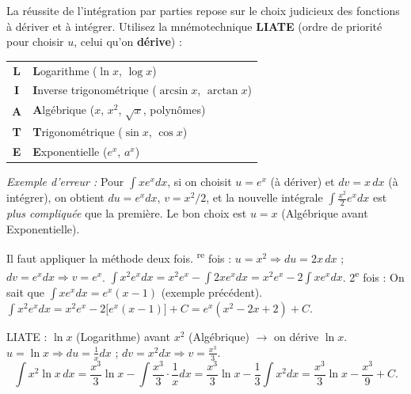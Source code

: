 \documentclass[11pt]{article}
\begin{document}
\begin{attention}
La réussite de l'intégration par parties repose sur le choix judicieux des fonctions à dériver et à intégrer. Utilisez la mnémotechnique \textbf{LIATE} (ordre de priorité pour choisir $u$, celui qu'on \textbf{dérive}) :
\begin{center}
\begin{tabular}{|c|l|}
\hline
\textbf{L} & \textbf{L}ogarithme ($\ln x$, $\log x$) \\
\textbf{I} & \textbf{I}nverse trigonométrique ($\arcsin x$, $\arctan x$) \\
\textbf{A} & \textbf{A}lgébrique ($x$, $x^2$, $\sqrt{x}$, polynômes) \\
\textbf{T} & \textbf{T}rigonométrique ($\sin x$, $\cos x$) \\
\textbf{E} & \textbf{E}xponentielle ($e^x$, $a^x$) \\
\hline
\end{tabular}
\end{center}
\emph{Exemple d'erreur :} Pour $\int x e^x dx$, si on choisit $u=e^x$ (à dériver) et $dv=x\,dx$ (à intégrer), on obtient $du=e^x dx$, $v=x^2/2$, et la nouvelle intégrale $\int \frac{x^2}{2}e^x dx$ est \emph{plus compliquée} que la première. Le bon choix est $u=x$ (Algébrique avant Exponentielle).
\end{attention}

\begin{exemplebox}
Il faut appliquer la méthode deux fois.
\textsuperscript{re} fois : $u=x^2 \Rightarrow du=2x\,dx$ ; $dv=e^x dx \Rightarrow v=e^x$.
$\int x^2 e^x dx = x^2 e^x - \int 2x e^x dx = x^2 e^x - 2\int x e^x dx$.
2\textsuperscript{e} fois : On sait que $\int x e^x dx = e^x(x-1)$ (exemple précédent).
$\int x^2 e^x dx = x^2 e^x - 2\bigl[ e^x(x-1) \bigr] + C = e^x(x^2 - 2x + 2) + C$.
\end{exemplebox}

\begin{exemplebox}
LIATE : $\ln x$ (Logarithme) avant $x^2$ (Algébrique) $\rightarrow$ on dérive $\ln x$.
$u = \ln x \Rightarrow du = \frac{1}{x}dx$ ; $dv = x^2 dx \Rightarrow v = \frac{x^3}{3}$.
\tcblower
\[
\int x^2 \ln x \, dx = \frac{x^3}{3}\ln x - \int \frac{x^3}{3}\cdot\frac{1}{x}dx = \frac{x^3}{3}\ln x - \frac{1}{3}\int x^2 dx = \frac{x^3}{3}\ln x - \frac{x^3}{9} + C .
\]
\end{exemplebox}
\end{document}

